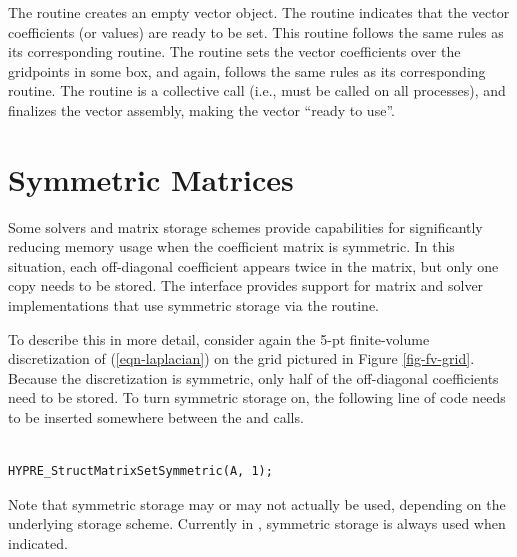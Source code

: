 The  routine creates an empty vector
object.  The  routine indicates
that the vector coefficients (or values) are ready to be set.  This
routine follows the same rules as its corresponding 
routine.  The  routine sets the
vector coefficients over the gridpoints in some box, and again,
follows the same rules as its corresponding  routine.
The  routine is a collective call
(i.e., must be called on all processes), and finalizes the vector
assembly, making the vector ``ready to use''.


\section{Symmetric Matrices}
\label{Symmetric Matrices}

Some solvers and matrix storage schemes provide capabilities for
significantly reducing memory usage when the coefficient matrix is
symmetric.  In this situation, each off-diagonal coefficient appears
twice in the matrix, but only one copy needs to be stored.  The
 interface provides support for matrix and solver
implementations that use symmetric storage via the
 routine.

To describe this in more detail, consider again the 5-pt finite-volume
discretization of (\ref{eqn-laplacian}) on the grid pictured in Figure
\ref{fig-fv-grid}.  Because the discretization is symmetric, only half
of the off-diagonal coefficients need to be stored.  To turn symmetric
storage on, the following line of code needs to be inserted somewhere
between the  and
 calls.
\begin{display}
\begin{verbatim}

HYPRE_StructMatrixSetSymmetric(A, 1);

\end{verbatim}
\end{display}
Note that symmetric storage may or may not actually be used, depending
on the underlying storage scheme.  Currently in \hypre{}, symmetric
storage is always used when indicated.

